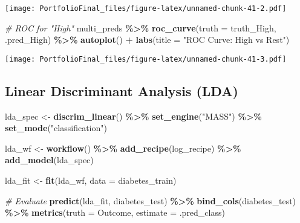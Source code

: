 \documentclass[
]{article}
\newenvironment{Shaded}{\begin{snugshade}}{\end{snugshade}}
\newcommand{\AttributeTok}[1]{\textcolor[rgb]{0.13,0.29,0.53}{#1}}
\newcommand{\CommentTok}[1]{\textcolor[rgb]{0.56,0.35,0.01}{\textit{#1}}}
\newcommand{\FunctionTok}[1]{\textcolor[rgb]{0.13,0.29,0.53}{\textbf{#1}}}
\newcommand{\NormalTok}[1]{#1}
\newcommand{\OtherTok}[1]{\textcolor[rgb]{0.56,0.35,0.01}{#1}}
\newcommand{\SpecialCharTok}[1]{\textcolor[rgb]{0.81,0.36,0.00}{\textbf{#1}}}
\newcommand{\StringTok}[1]{\textcolor[rgb]{0.31,0.60,0.02}{#1}}
\begin{document}
\texttt{[image: PortfolioFinal\_files/figure-latex/unnamed-chunk-41-2.pdf]}

\begin{Shaded}
\begin{Highlighting}[]
\CommentTok{\# ROC for "High"}
\NormalTok{multi\_preds }\SpecialCharTok{\%\textgreater{}\%}
  \FunctionTok{roc\_curve}\NormalTok{(}\AttributeTok{truth =}\NormalTok{ truth\_High, .pred\_High) }\SpecialCharTok{\%\textgreater{}\%}
  \FunctionTok{autoplot}\NormalTok{() }\SpecialCharTok{+}
  \FunctionTok{labs}\NormalTok{(}\AttributeTok{title =} \StringTok{"ROC Curve: High vs Rest"}\NormalTok{)}
\end{Highlighting}
\end{Shaded}

\texttt{[image: PortfolioFinal\_files/figure-latex/unnamed-chunk-41-3.pdf]}

\subsection{Linear Discriminant Analysis
(LDA)}\label{linear-discriminant-analysis-lda-1}

\begin{Shaded}
\begin{Highlighting}[]
\NormalTok{lda\_spec }\OtherTok{\textless{}{-}} \FunctionTok{discrim\_linear}\NormalTok{() }\SpecialCharTok{\%\textgreater{}\%}
  \FunctionTok{set\_engine}\NormalTok{(}\StringTok{"MASS"}\NormalTok{) }\SpecialCharTok{\%\textgreater{}\%}
  \FunctionTok{set\_mode}\NormalTok{(}\StringTok{"classification"}\NormalTok{)}

\NormalTok{lda\_wf }\OtherTok{\textless{}{-}} \FunctionTok{workflow}\NormalTok{() }\SpecialCharTok{\%\textgreater{}\%}
  \FunctionTok{add\_recipe}\NormalTok{(log\_recipe) }\SpecialCharTok{\%\textgreater{}\%}
  \FunctionTok{add\_model}\NormalTok{(lda\_spec)}

\NormalTok{lda\_fit }\OtherTok{\textless{}{-}} \FunctionTok{fit}\NormalTok{(lda\_wf, }\AttributeTok{data =}\NormalTok{ diabetes\_train)}

\CommentTok{\# Evaluate}
\FunctionTok{predict}\NormalTok{(lda\_fit, diabetes\_test) }\SpecialCharTok{\%\textgreater{}\%}
  \FunctionTok{bind\_cols}\NormalTok{(diabetes\_test) }\SpecialCharTok{\%\textgreater{}\%}
  \FunctionTok{metrics}\NormalTok{(}\AttributeTok{truth =}\NormalTok{ Outcome, }\AttributeTok{estimate =}\NormalTok{ .pred\_class)}
\end{Highlighting}
\end{Shaded}
\end{document}
